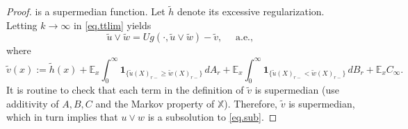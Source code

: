 \documentclass[11pt,a4paper,reqno]{amsart}
\theoremstyle{definition}
\numberwithin{equation}{section}
\begin{document}
\begin{proof}
is a supermedian function. Let $\tilde h$ denote its excessive regularization.
Letting $k\to \infty$ in \eqref{eq.ttlim} yields 
$$
\tilde u \vee \tilde w=Ug(\cdot, \tilde  u \vee  \tilde w)-\tilde v, \quad \text { a.e., }
$$
where 
\[
\tilde v(x):=\tilde h(x)+\mathbb{E}_x \int_0^{\infty} \mathbf{1}_{\{\tilde u(X)_{r-} \geq \tilde w(X)_{r-}\}} \,d A_r
+\mathbb{E}_x \int_0^{\infty} \mathbf{1}_{\{\tilde u(X)_{r-} < \tilde w(X)_{r-}\}}\,d B_r+\mathbb{E}_x C_{\infty}. 
\]
It is routine to  check that each term in the definition of $\tilde v$ is supermedian  
(use additivity of $A,B,C$ and the Markov property of $\mathbb X$). 
Therefore, $\tilde v$ is supermedian, which in turn implies that  $u \vee w$ is a subsolution to \eqref{eq.sub}.
\end{proof}
\end{document}
